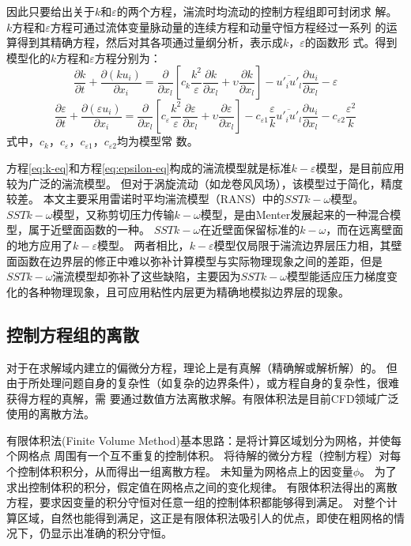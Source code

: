 因此只要给出关于$k$和$\varepsilon$的两个方程，湍流时均流动的控制方程组即可封闭求
解。
$k$方程和$\varepsilon$方程可通过流体变量脉动量的连续方程和动量守恒方程经过一系列
的运算得到其精确方程，然后对其各项通过量纲分析，表示成$k$，$\varepsilon$的函数形
式。得到模型化的$k$方程和$\varepsilon$方程分别为：
\begin{equation}
  \label{eq:k-eq}
  \frac{{\partial k}}{{\partial t}} + \frac{{\partial \left( {k{u_i}} \right)}}{{\partial {x_i}}} =
    \frac{\partial }{{\partial {x_l}}}\left[ {{c_k}\frac{{{k^2}}}{\varepsilon }\frac{{\partial k}}{{\partial {x_l}}} +\upsilon \frac{{\partial k}}{{\partial {x_l}}}} \right] - \overline {{{u'}_i}{{u'}_l}} \frac{{\partial {u_i}}}{{\partial {x_l}}} - \varepsilon
\end{equation}
\begin{equation}
  \label{eq:epsilon-eq}
  \frac{{\partial \varepsilon }}{{\partial t}} + \frac{{\partial \left( {\varepsilon {u_i}} \right)}}{{\partial {x_i}}} =
    \frac{\partial }{{\partial {x_l}}}\left[ {{c_\varepsilon }\frac{{{k^2}}}{\varepsilon }\frac{{\partial \varepsilon }}{{\partial {x_l}}} +
        \upsilon \frac{{\partial \varepsilon }}{{\partial {x_l}}}} \right] -
    {c_{\varepsilon 1}}\frac{\varepsilon }{k}\overline {{{u'}_i}{{u'}_l}} \frac{{\partial {u_i}}}{{\partial {x_l}}} -
    {c_{\varepsilon 2}}\frac{{{\varepsilon ^2}}}{k}
\end{equation}
式中，$c_k$，$c_\varepsilon$，$c_{\varepsilon 1}$，$c_{\varepsilon 2}$均为模型常
数。

方程\eqref{eq:k-eq}和方程\eqref{eq:epsilon-eq}构成的湍流模型就是标准$k-\varepsilon$模型，是目前应用较为广泛的湍流模型。
但对于涡旋流动（如龙卷风风场），该模型过于简化，精度较差。
本文主要采用雷诺时平均湍流模型（RANS）中的$SST k-\omega$模型。
$SST k-\omega$模型，又称剪切压力传输$k-\omega$模型，是由Menter\cite{menter1993zonal}发展起来的一种混合模型，属于近壁面函数的一种。
$SST k-\omega$在近壁面保留标准的$k-\omega$，而在远离壁面的地方应用了$k-\varepsilon$模型。
两者相比，$k-\varepsilon$模型仅局限于湍流边界层压力相，其壁面函数在边界层的修正中难以弥补计算模型与实际物理现象之间的差距，但是$SST k-\omega$湍流模型却弥补了这些缺陷，主要因为$SST k-\omega$模型能适应压力梯度变化的各种物理现象，且可应用粘性内层更为精确地模拟边界层的现象。


\subsection{控制方程组的离散}
对于在求解域内建立的偏微分方程，理论上是有真解（精确解或解析解）的。
但由于所处理问题自身的复杂性（如复杂的边界条件），或方程自身的复杂性，很难获得方程的真解，需
要通过数值方法离散求解。有限体积法是目前CFD领域广泛使用的离散方法。

有限体积法(Finite Volume Method)基本思路：是将计算区域划分为网格，并使每个网格点
周围有一个互不重复的控制体积。
将待解的微分方程（控制方程）对每个控制体积积分，从而得出一组离散方程。
未知量为网格点上的因变量$\phi$。
为了求出控制体积的积分，假定值在网格点之间的变化规律。
有限体积法得出的离散方程，要求因变量的积分守恒对任意一组的控制体积都能够得到满足。
对整个计算区域，自然也能得到满足，这正是有限体积法吸引人的优点，即使在粗网格的情
况下，仍显示出准确的积分守恒。

